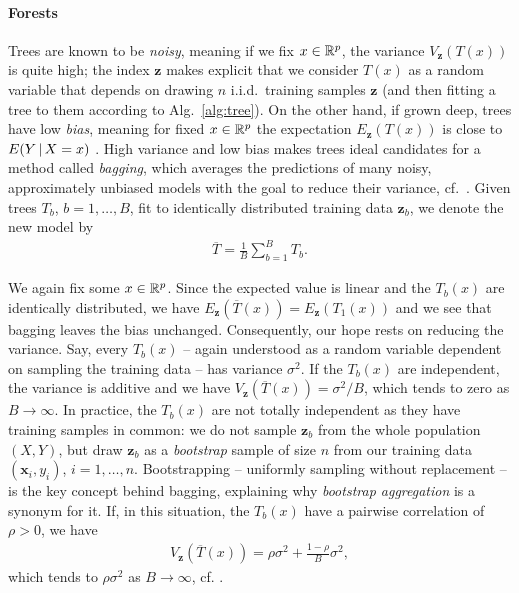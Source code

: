 \paragraph{Forests}
Trees are known to be \textit{noisy}, meaning if we fix $x \in \mathbb{R}^p$, the variance 
$V_\mathbf{z}(T(x))$ is quite high; the index $\mathbf{z}$ makes explicit that we consider $T(x)$ as 
a random variable that depends on drawing $n$ i.i.d.\ training samples $\mathbf{z}$ (and 
then fitting a tree to them according to Alg.\ \ref{alg:tree}). On the other hand, if grown deep,
trees have low \textit{bias}, meaning for fixed $x \in \mathbb{R}^p$ the expectation $E_\mathbf{z}(T(x))$ 
is close to $E(Y \,|\, X = x)$ \cite{elem-stat-learn01}. High variance and low bias makes trees 
ideal candidates for a method called \textit{bagging}, which averages the predictions of many noisy, 
approximately unbiased models with the goal to reduce their variance, cf.\ \cite{breiman96}. Given 
trees $T_b$, $b = 1, 
\ldots, B$, fit to identically distributed training data $\mathbf{z}_b$, we denote the new model 
by 
\begin{align}
    \overline{T} = \frac{1}{B} \sum_{b=1}^B T_b.
\end{align}

We again fix some $x \in \mathbb{R}^p$. Since the expected value is linear and the $T_b(x)$ are identically 
distributed, we have $E_\mathbf{z}(\overline{T}(x)) = E_\mathbf{z}(T_1(x))$ and we see that bagging 
leaves the bias unchanged. Consequently, our hope rests on reducing the variance. Say, every 
$T_b(x)$ -- again understood as a random variable dependent on sampling the training data -- has 
variance $\sigma^2$. If the $T_b(x)$ are independent, the variance is additive and we have 
$V_\mathbf{z}(\overline{T}(x)) = \sigma^2/B$, which tends to zero as $B \to \infty$. In practice, 
the $T_b(x)$ are not totally independent as they have training samples in common: we do not 
sample $\mathbf{z}_b$ from the whole population $(X, Y)$, but draw $\mathbf{z}_b$ as a 
\textit{bootstrap} sample of size $n$ from our training 
data $(\mathbf{x}_i, y_i)$, $i = 1, \ldots, n$. Bootstrapping -- uniformly sampling without 
replacement -- is the key concept behind bagging, 
explaining why \textit{bootstrap aggregation} is a synonym for it. If, in this situation, the 
$T_b(x)$ have a pairwise correlation of $\rho > 0$, we have 
\begin{align}
    V_\mathbf{z}\left(\overline{T}(x)\right) = \rho \sigma^2 + \frac{1-\rho}{B} \sigma^2,
\end{align}
which tends to $\rho \sigma^2$ as $B \to \infty$, cf. \cite[Eq. (15.1)]{elem-stat-learn01}.

